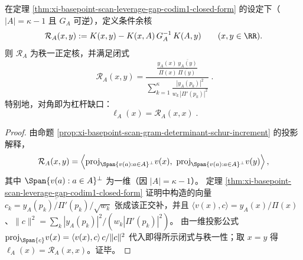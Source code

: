 %

\begin{proposition}[余维一锚定的条件余核：秩一闭式与 \texorpdfstring{$\ell_A=\mathcal{R}_A(\cdot,\cdot)$}{ellA=residual}]\label{prop:xi-basepoint-scan-residual-kernel-codim1-rankone}
在定理 \ref{thm:xi-basepoint-scan-leverage-gap-codim1-closed-form} 的设定下（\(|A|=\kappa-1\) 且 \(G_A\) 可逆），定义条件余核
\[
\mathcal{R}_A(x,y):=K(x,y)-K(x,A)\,G_A^{-1}\,K(A,y)\qquad(x,y\in\RR).
\]
则 \(\mathcal{R}_A\) 为秩一正定核，并满足闭式
\[
\boxed{\;
\mathcal{R}_A(x,y)
=
\frac{\displaystyle \frac{y_A(x)\,\overline{y_A(y)}}{\Pi(x)\,\overline{\Pi(y)}}}{
\displaystyle \sum_{k=1}^{\kappa}\frac{|y_A(p_k)|^2}{w_k\,|\Pi'(p_k)|^2}
}\; }.
\]
特别地，对角即为杠杆缺口：
\[
\boxed{\;\ell_A(x)=\mathcal{R}_A(x,x)\; }.
\]
\end{proposition}
\begin{proof}
由命题 \ref{prop:xi-basepoint-scan-gram-determinant-schur-increment} 的投影解释，
\[
\mathcal{R}_A(x,y)=\left\langle \mathrm{proj}_{\Span\{v(a):a\in A\}^\perp}v(x),\ \mathrm{proj}_{\Span\{v(a):a\in A\}^\perp}v(y)\right\rangle,
\]
其中 \(\Span\{v(a):a\in A\}^\perp\) 为一维（因 \(|A|=\kappa-1\)）。
定理 \ref{thm:xi-basepoint-scan-leverage-gap-codim1-closed-form} 证明中构造的向量
\(
c_k=\overline{y_A(p_k)/\Pi'(p_k)}/\sqrt{w_k}
\)
张成该正交补，并且 \(\langle v(x),c\rangle=y_A(x)/\Pi(x)\)、\(\|c\|^2=\sum_k |y_A(p_k)|^2/(w_k|\Pi'(p_k)|^2)\)。
由一维投影公式
\(
\mathrm{proj}_{\Span\{c\}}v(x)=\langle v(x),c\rangle\,c/\|c\|^2
\)
代入即得所示闭式与秩一性；取 \(x=y\) 得 \(\ell_A(x)=\mathcal{R}_A(x,x)\)。证毕。
\end{proof}

